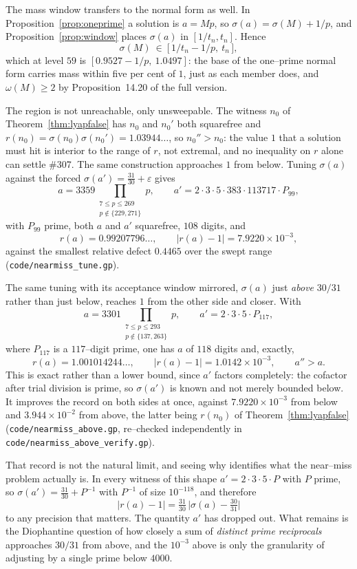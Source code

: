 \documentclass[11pt]{article}
\theoremstyle{definition}
\begin{document}
The mass window transfers to the normal form as well. In Proposition~\ref{prop:oneprime} a solution
is $a=Mp$, so $\sigma(a)=\sigma(M)+1/p$, and Proposition~\ref{prop:window} places $\sigma(a)$ in
$[1/t_n,t_n]$. Hence
\[ \sigma(M)\ \in\ \bigl[\,1/t_n-1/p,\ t_n\,\bigr], \]
which at level $59$ is $[0.9527-1/p,\ 1.0497]$: the base of the one--prime normal form carries mass
within five per cent of $1$, just as each member does, and $\omega(M)\ge2$ by
Proposition~14.20 of the full version.

The region is not unreachable, only unsweepable. The witness $n_0$ of
Theorem~\ref{thm:lyapfalse} has $n_0$ and $n_0'$ both squarefree and
$r(n_0)=\sigma(n_0)\sigma(n_0')=1.03944\ldots$, so $n_0''>n_0$: the value $1$ that a solution must
hit is interior to the range of $r$, not extremal, and no inequality on $r$ alone can settle \#307.
The same construction approaches $1$ from below. Tuning $\sigma(a)$ against the forced
$\sigma(a')=\tfrac{31}{30}+\varepsilon$ gives
\[ a=3359\!\!\prod_{\substack{7\le p\le269\\p\notin\{229,271\}}}\!\!p,\qquad
   a'=2\cdot3\cdot5\cdot383\cdot113717\cdot P_{99}, \]
with $P_{99}$ prime, both $a$ and $a'$ squarefree, $108$ digits, and
\[ r(a)=0.99207796\ldots,\qquad |r(a)-1|=7.9220\times10^{-3}, \]
against the smallest relative defect $0.4465$ over the swept range
\textup{(\texttt{code/nearmiss\_tune.gp})}.

The same tuning with its acceptance window mirrored, $\sigma(a)$ just \emph{above} $30/31$ rather than
just below, reaches $1$ from the other side and closer. With
\[ a=3301\!\!\prod_{\substack{7\le p\le293\\ p\notin\{137,263\}}}\!\!p, \qquad
   a'=2\cdot3\cdot5\cdot P_{117}, \]
where $P_{117}$ is a $117$--digit prime, one has $a$ of $118$ digits and, exactly,
\[ r(a)=1.001014244\ldots,\qquad |r(a)-1|=1.0142\times10^{-3},\qquad a''>a. \]
This is exact rather than a lower bound, since $a'$ factors completely: the cofactor after trial
division is prime, so $\sigma(a')$ is known and not merely bounded below. It improves the record on
both sides at once, against $7.9220\times10^{-3}$ from below and $3.944\times10^{-2}$ from above,
the latter being $r(n_0)$ of Theorem~\ref{thm:lyapfalse}
\textup{(\texttt{code/nearmiss\_above.gp}, re--checked independently in
\texttt{code/nearmiss\_above\_verify.gp})}.

That record is not the natural limit, and seeing why identifies what the near--miss problem actually
is. In every witness of this shape $a'=2\cdot3\cdot5\cdot P$ with $P$ prime, so
$\sigma(a')=\tfrac{31}{30}+P^{-1}$ with $P^{-1}$ of size $10^{-118}$, and therefore
\[ |r(a)-1|=\tfrac{31}{30}\,\bigl|\sigma(a)-\tfrac{30}{31}\bigr| \]
to any precision that matters. The quantity $a'$ has dropped out. What remains is the Diophantine
question of how closely a sum of \emph{distinct prime reciprocals} approaches $30/31$ from above, and
the $10^{-3}$ above is only the granularity of adjusting by a single prime below $4000$.
\end{document}
